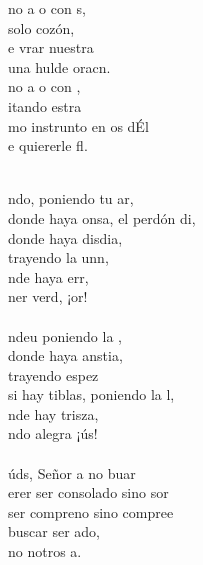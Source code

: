 \begin{cancion}%
	\begin{chorus}%
	no a o con s,\\
	 solo cozón,\\
	e vrar nuestra   \\
	 una hulde oracn.\\
	no a o con , \\
	itando estra \\
	mo instrunto en os dÉl\\
	e quiererle fl.\\
	\end{chorus}%
	\jump\\
	ndo, poniendo tu ar,\\
	donde haya onsa, el perdón di,\\
	donde haya disdia, \\
	trayendo la unn,\\
	nde haya err, \\
	ner verd, ¡or! \\
	\jump\\
	ndeu poniendo la ,\\
	donde haya anstia,\\
	trayendo espez\\
	si hay tiblas, poniendo la l,\\
	nde hay trisza, \\
	ndo alegra ¡ús!\\
	\jump\\
	úds, Señor a no buar\\
	erer ser consolado sino sor\\
	ser compreno sino compree\\
	 buscar ser ado,\\
	no notros a.\\
\end{cancion}%
